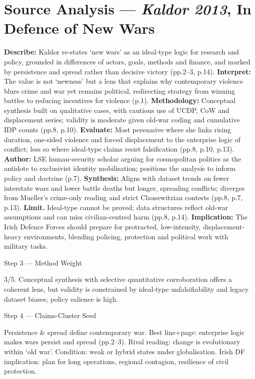 \section*{Source Analysis — \textit{Kaldor 2013}, In Defence of New Wars}
\textbf{Describe:} Kaldor re-states ‘new wars’ as an ideal-type logic for research and policy, grounded in differences of actors, goals, methods and finance, and marked by persistence and spread rather than decisive victory (pp.2–3, p.14).
\textbf{Interpret:} The value is not ‘newness’ but a lens that explains why contemporary violence blurs crime and war yet remains political, redirecting strategy from winning battles to reducing incentives for violence (p.1).
\textbf{Methodology:} Conceptual synthesis built on qualitative cases, with cautious use of UCDP, CoW and displacement series; validity is moderate given old-war coding and cumulative IDP counts (pp.8, p.10).
\textbf{Evaluate:} Most persuasive where she links rising duration, one-sided violence and forced displacement to the enterprise logic of conflict; less so where ideal-type claims resist falsification (pp.8, p.10, p.13).
\textbf{Author:} LSE human-security scholar arguing for cosmopolitan politics as the antidote to exclusivist identity mobilisation; positions the analysis to inform policy and doctrine (p.7).
\textbf{Synthesis:} Aligns with dataset trends on fewer interstate wars and lower battle deaths but longer, spreading conflicts; diverges from Mueller’s crime-only reading and strict Clausewitzian contests (pp.8, p.7, p.13).
\textbf{Limit.} Ideal-type cannot be proved; data structures reflect old-war assumptions and can miss civilian-centred harm (pp.8, p.14).
\textbf{Implication:} The Irish Defence Forces should prepare for protracted, low-intensity, displacement-heavy environments, blending policing, protection and political work with military tasks.

Step 3 — Method Weight

3/5. Conceptual synthesis with selective quantitative corroboration offers a coherent lens, but validity is constrained by ideal-type unfalsifiability and legacy dataset biases; policy salience is high.

Step 4 — Claims-Cluster Seed

Persistence \& spread define contemporary war.
Best line+page: enterprise logic makes wars persist and spread (pp.2–3). Rival reading: change is evolutionary within ‘old war’. Condition: weak or hybrid states under globalisation. Irish DF implication: plan for long operations, regional contagion, resilience of civil protection.

